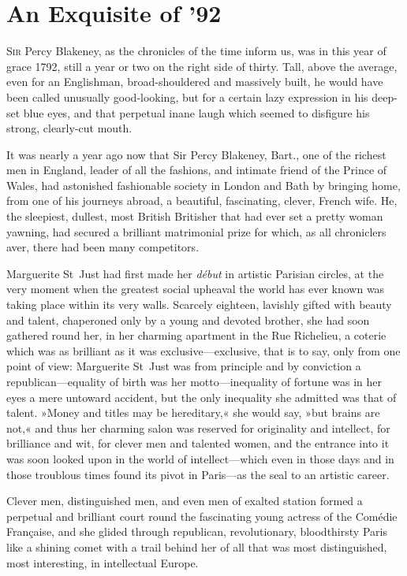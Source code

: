 
\chapter{An Exquisite of '92}
\lettrine[lines=4]{S}{ir} Percy Blakeney, as the chronicles of the time inform us, was in this year of grace 1792, still a year or two on the right side of thirty. Tall, above the average, even for an Englishman, broad-shouldered and massively built, he would have been called unusually good-looking, but for a certain lazy expression in his deep-set blue eyes, and that perpetual inane laugh which seemed to disfigure his strong, clearly-cut mouth.

It was nearly a year ago now that Sir Percy Blakeney, Bart., one of the richest men in England, leader of all the fashions, and intimate friend of the Prince of Wales, had astonished fashionable society in London and Bath by bringing home, from one of his journeys abroad, a beautiful, fascinating, clever, French wife. He, the sleepiest, dullest, most British Britisher that had ever set a pretty woman yawning, had secured a brilliant matrimonial prize for which, as all chroniclers aver, there had been many competitors.

Marguerite St~Just had first made her \textit{début} in artistic Parisian circles, at the very moment when the greatest social upheaval the world has ever known was taking place within its very walls. Scarcely eighteen, lavishly gifted with beauty and talent, chaperoned only by a young and devoted brother, she had soon gathered round her, in her charming apartment in the Rue Richelieu, a coterie which was as brilliant as it was exclusive—exclusive, that is to say, only from one point of view: Marguerite St~Just was from principle and by conviction a republican—equality of birth was her motto—inequality of fortune was in her eyes a mere untoward accident, but the only inequality she admitted was that of talent. »Money and titles may be hereditary,« she would say, »but brains are not,« and thus her charming salon was reserved for originality and intellect, for brilliance and wit, for clever men and talented women, and the entrance into it was soon looked upon in the world of intellect—which even in those days and in those troublous times found its pivot in Paris—as the seal to an artistic career.

Clever men, distinguished men, and even men of exalted station formed a perpetual and brilliant court round the fascinating young actress of the Comédie Française, and she glided through republican, revolutionary, bloodthirsty Paris like a shining comet with a trail behind her of all that was most distinguished, most interesting, in intellectual Europe.


